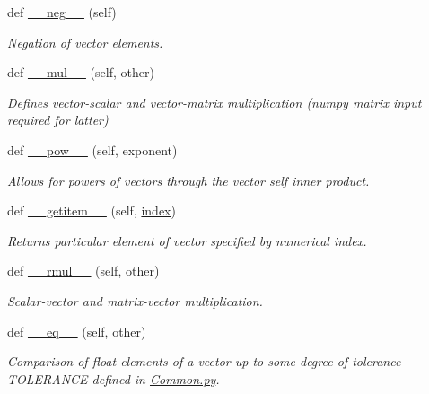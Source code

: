\begin{DoxyCompactItemize}
def \hyperlink{class_py_spinor_1_1_lorentz_vector_1_1_lorentz_vector_af7178d2be820ce5c50e01c8c03fb3cef}{\+\_\+\+\_\+neg\+\_\+\+\_\+} (self)
\begin{DoxyCompactList}\small\item\em Negation of vector elements. \end{DoxyCompactList}\item 
def \hyperlink{class_py_spinor_1_1_lorentz_vector_1_1_lorentz_vector_a4b6ca093f716869de228bd9611e8cd40}{\+\_\+\+\_\+mul\+\_\+\+\_\+} (self, other)
\begin{DoxyCompactList}\small\item\em Defines vector-\/scalar and vector-\/matrix multiplication (numpy matrix input required for latter) \end{DoxyCompactList}\item 
def \hyperlink{class_py_spinor_1_1_lorentz_vector_1_1_lorentz_vector_a9c2aeb0c1d496ffd0d6fe4e3d551f451}{\+\_\+\+\_\+pow\+\_\+\+\_\+} (self, exponent)
\begin{DoxyCompactList}\small\item\em Allows for powers of vectors through the vector self inner product. \end{DoxyCompactList}\item 
def \hyperlink{class_py_spinor_1_1_lorentz_vector_1_1_lorentz_vector_a1affc9d1cf09f3f7dbe85742c7ce7a6c}{\+\_\+\+\_\+getitem\+\_\+\+\_\+} (self, \hyperlink{class_py_spinor_1_1_lorentz_vector_1_1_lorentz_vector_a11da34cf107e38100b3bfb509eac2d1f}{index})
\begin{DoxyCompactList}\small\item\em Returns particular element of vector specified by numerical index. \end{DoxyCompactList}\item 
def \hyperlink{class_py_spinor_1_1_lorentz_vector_1_1_lorentz_vector_a8c669764e80ef2c4100a898e9b1ab7d6}{\+\_\+\+\_\+rmul\+\_\+\+\_\+} (self, other)
\begin{DoxyCompactList}\small\item\em Scalar-\/vector and matrix-\/vector multiplication. \end{DoxyCompactList}\item 
def \hyperlink{class_py_spinor_1_1_lorentz_vector_1_1_lorentz_vector_a8fbfe5ece750a1a53a99f609972ad616}{\+\_\+\+\_\+eq\+\_\+\+\_\+} (self, other)
\begin{DoxyCompactList}\small\item\em Comparison of float elements of a vector up to some degree of tolerance T\+O\+L\+E\+R\+A\+N\+C\+E defined in \hyperlink{_common_8py}{Common.\+py}. \end{DoxyCompactList}\item 

\end{DoxyCompactItemize}
